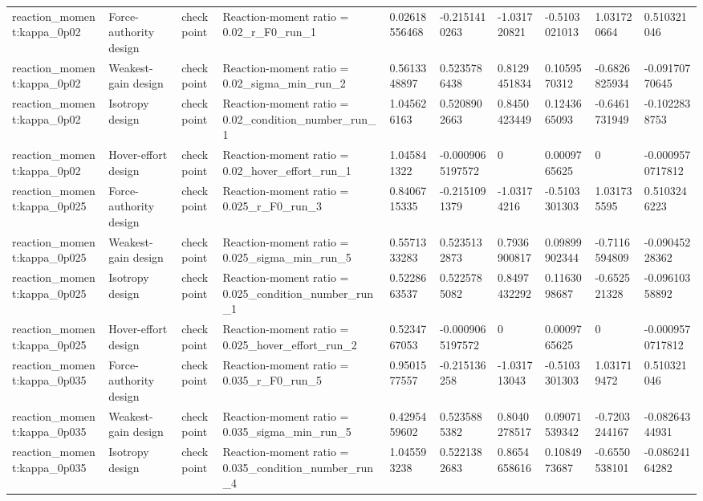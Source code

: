\begin{tabular}{@{}llllllllll@{}}
reaction\_moment:kappa\_0p02 & Force-authority design & checkpoint & Reaction-moment ratio = 0.02\_r\_F0\_run\_1 & 0.02618556468 & -0.2151410263 & -1.031720821 & -0.5103021013 & 1.031720664 & 0.510321046 \\
reaction\_moment:kappa\_0p02 & Weakest-gain design & checkpoint & Reaction-moment ratio = 0.02\_sigma\_min\_run\_2 & 0.5613348897 & 0.5235786438 & 0.8129451834 & 0.1059570312 & -0.6826825934 & -0.09170770645 \\
reaction\_moment:kappa\_0p02 & Isotropy design & checkpoint & Reaction-moment ratio = 0.02\_condition\_number\_run\_1 & 1.045626163 & 0.5208902663 & 0.8450423449 & 0.1243665093 & -0.6461731949 & -0.1022838753 \\
reaction\_moment:kappa\_0p02 & Hover-effort design & checkpoint & Reaction-moment ratio = 0.02\_hover\_effort\_run\_1 & 1.045841322 & -0.0009065197572 & 0 & 0.0009765625 & 0 & -0.0009570717812 \\
reaction\_moment:kappa\_0p025 & Force-authority design & checkpoint & Reaction-moment ratio = 0.025\_r\_F0\_run\_3 & 0.8406715335 & -0.2151091379 & -1.03174216 & -0.5103301303 & 1.031735595 & 0.5103246223 \\
reaction\_moment:kappa\_0p025 & Weakest-gain design & checkpoint & Reaction-moment ratio = 0.025\_sigma\_min\_run\_5 & 0.5571333283 & 0.5235132873 & 0.7936900817 & 0.09899902344 & -0.7116594809 & -0.09045228362 \\
reaction\_moment:kappa\_0p025 & Isotropy design & checkpoint & Reaction-moment ratio = 0.025\_condition\_number\_run\_1 & 0.5228663537 & 0.5225785082 & 0.8497432292 & 0.1163098687 & -0.652521328 & -0.09610358892 \\
reaction\_moment:kappa\_0p025 & Hover-effort design & checkpoint & Reaction-moment ratio = 0.025\_hover\_effort\_run\_2 & 0.5234767053 & -0.0009065197572 & 0 & 0.0009765625 & 0 & -0.0009570717812 \\
reaction\_moment:kappa\_0p035 & Force-authority design & checkpoint & Reaction-moment ratio = 0.035\_r\_F0\_run\_5 & 0.9501577557 & -0.215136258 & -1.031713043 & -0.5103301303 & 1.031719472 & 0.510321046 \\
reaction\_moment:kappa\_0p035 & Weakest-gain design & checkpoint & Reaction-moment ratio = 0.035\_sigma\_min\_run\_5 & 0.4295459602 & 0.5235885382 & 0.8040278517 & 0.09071539342 & -0.7203244167 & -0.08264344931 \\
reaction\_moment:kappa\_0p035 & Isotropy design & checkpoint & Reaction-moment ratio = 0.035\_condition\_number\_run\_4 & 1.045593238 & 0.5221382683 & 0.8654658616 & 0.1084973687 & -0.6550538101 & -0.08624164282 \\

\end{tabular}
